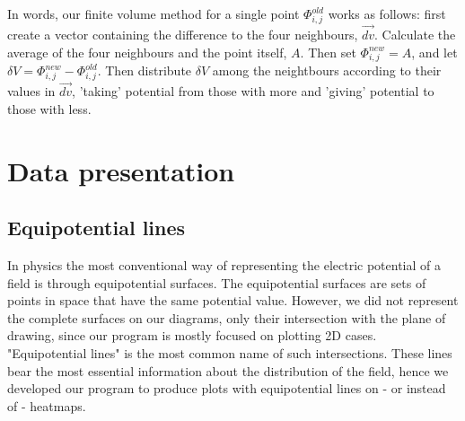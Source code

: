 \documentclass[aps,twocolumn,pre,nofootinbib,10pt]{revtex4-1}
\begin{document}
In words, our finite volume method for a single point $\Phi_{i,j}^{old}$ works as follows: first create a vector containing the difference to the four neighbours, $\vec{dv}$. Calculate the average of the four neighbours and the point itself, $A$. Then set $\Phi_{i,j}^{new} = A$, and let $\delta V = \Phi_{i,j}^{new} - \Phi_{i,j}^{old}$. Then distribute $\delta V$ among the neightbours according to their values in $\vec{dv}$, 'taking' potential from those with more and 'giving' potential to those with less.


\section{Data presentation}
\subsection{Equipotential lines}
In physics the most conventional way of representing the electric potential of a field is through equipotential surfaces. The equipotential surfaces are sets of points in space that have the same potential value. However, we did not represent the complete surfaces on our diagrams, only their intersection with the plane of drawing, since our program is mostly focused on plotting 2D cases. "Equipotential lines" is the most common name of such intersections. These lines bear the most essential information about the distribution of the field, hence we developed our program to produce plots with equipotential lines on - or instead of - heatmaps.
\end{document}
